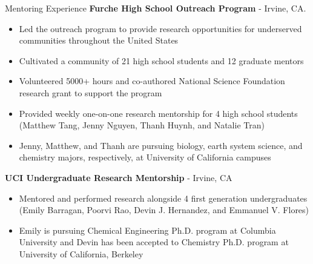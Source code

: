 \begin{rubric}{Mentoring Experience}
   \textbf{Furche High School Outreach Program} - Irvine, CA.
  \vspace{-0.5em}
   \begin{itemize}
     \itemsep-0.5em
   \item Led the outreach program to provide research opportunities for underserved communities
     throughout the United States
   \item Cultivated a community of 21 high school students and
     12 graduate mentors
   \item Volunteered 5000+ hours and co-authored National Science Foundation research grant
     to support the program
   \item Provided weekly one-on-one research mentorship for 4 high school students
     (Matthew Tang, Jenny Nguyen, Thanh Huynh, and Natalie Tran)
   \item Jenny, Matthew, and Thanh are pursuing biology, earth system science, and chemistry
     majors, respectively, at University of California campuses
     \vspace{-1em}
   \end{itemize}
    \textbf{UCI Undergraduate Research Mentorship} - Irvine, CA
   \vspace{-0.5em}
   \begin{itemize}
     \itemsep-0.5em
   \item Mentored and performed research alongside 4 first generation undergraduates
     (Emily Barragan, Poorvi Rao, Devin J. Hernandez, and Emmanuel V. Flores)
   \item Emily is pursuing Chemical Engineering Ph.D. program at Columbia University and
     Devin has been accepted to Chemistry Ph.D. program at University of California, Berkeley
     \vspace{-1em}
   \end{itemize}
   

\end{rubric}
